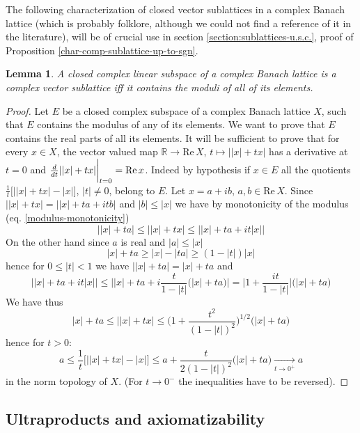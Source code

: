 \documentclass[11pt]{amsart}
\theoremstyle{plain}
\newtheorem{lemma}[theorem]{Lemma}
\theoremstyle{remark}
\newcommand{\reel}{\mathbb R}
\renewcommand{\Re}{\mathrm {Re\,}}
\newcommand{\To}{\mathop{\longrightarrow}}
\begin{document}
The following characterization of  closed vector sublattices in a complex Banach lattice (which is probably folklore, although we could not find a reference of it in the literature), will be of crucial use in section \ref{section:sublattices-u.s.c.}, proof of Proposition \ref{char-comp-sublattice-up-to-sgn}.
\begin{lemma}\label{cpl-sublat-char}
A closed complex linear subspace of a complex Banach lattice is a complex vector sublattice iff it contains the moduli of all of its elements.
\end{lemma}
\begin{proof}
Let $E$ be a closed complex subspace of  a complex Banach lattice $X$, such that $E$ contains the modulus of any of its elements. We want to prove that $E$ contains the real parts of all its elements. It will be sufficient to prove that for every $x\in X$, the vector valued map $\reel\to \Re X$, $t\mapsto \big||x|+t x\big|$ has a derivative at $t=0$ and ${d\over dt}||x|+t x|\bigg|_{t=0}= \Re x$. Indeed by hypothesis if $x\in E$ all the quotients $\frac 1t\big[\big||x|+tx\big|-|x|\big]$, $|t|\ne 0$, belong to $E$. Let $x=a+ib$, $a,b\in \Re X$. Since $\big||x|+tx\big|= \big||x|+ta+itb\big|$ and $|b|\le |x|$ we have by monotonicity of the modulus (eq. \ref{modulus-monotonicity})
\[ \big||x|+ta\big| \le \big||x|+tx\big| \le \big||x|+ta+it|x|\big|\]
On the other hand since $a$ is real and  $|a|\le|x|$
\[ |x|+ta \ge |x|-|ta|\ge (1-|t|)|x|\]
hence for $0\le |t|<1$ we have $\big||x|+ta\big|=|x|+ta$ and
\[ \textstyle \big||x|+ta+it|x| \big| \le  \big||x|+ta+i\frac t{1-|t|}\big(|x|+ta\big)\big| = \big| 1+\frac {it}{1-|t|}\big|\big(|x|+ta\big)
\]
We have thus
\[\textstyle |x|+ta\le \big||x|+tx\big| \le  \big(1+\frac{t^2}{(1-|t|)^2}\big)^{1/2}\big(|x|+ta\big)
\]
hence for $t>0$:
\[ a\le \frac 1t\big[\big||x|+tx\big|-|x|\big]\le a+ \frac{t}{2(1-|t|)^2}\big(|x|+ta\big) \To\limits_{t\to 0^+} a
\]
in the norm topology of $X$. (For $t\to 0^-$ the inequalities have to be reversed).
\end{proof}

\subsection{Ultraproducts and axiomatizability}
\end{document}
